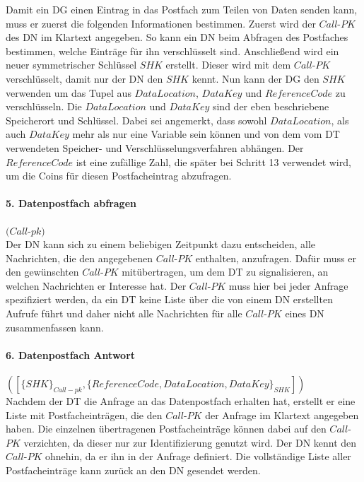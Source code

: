 \documentclass[
	fontsize=11pt,
	headings=small,
	parskip=half,           %
	bibliography=totoc,
	numbers=noenddot,       %
	open=any,               %
]{scrreprt}
\begin{document}
Damit ein DG einen Eintrag in das Postfach zum Teilen von Daten senden kann, muss er zuerst die folgenden Informationen bestimmen. Zuerst wird der $Call$-$PK$ des DN im Klartext angegeben. So kann ein DN beim Abfragen des Postfaches bestimmen, welche Einträge für ihn verschlüsselt sind. Anschließend wird ein neuer symmetrischer Schlüssel $SHK$ erstellt. Dieser wird mit dem $Call$-$PK$ verschlüsselt, damit nur der DN den $SHK$ kennt. Nun kann der DG den $SHK$ verwenden um das Tupel aus $DataLocation$, $DataKey$ und $ReferenceCode$ zu verschlüsseln. Die $DataLocation$ und $DataKey$ sind der eben beschriebene Speicherort und Schlüssel. Dabei sei angemerkt, dass sowohl $DataLocation$, als auch $DataKey$ mehr als nur eine Variable sein können und von dem vom DT verwendeten Speicher- und Verschlüsselungsverfahren abhängen. Der $ReferenceCode$ ist eine zufällige Zahl, die später bei Schritt 13 verwendet wird, um die Coins für diesen Postfacheintrag abzufragen.

\paragraph{5. Datenpostfach abfragen} $(Call$-$pk)$\\
Der DN kann sich zu einem beliebigen Zeitpunkt dazu entscheiden, alle Nachrichten, die den angegebenen $Call$-$PK$ enthalten, anzufragen. Dafür muss er den gewünschten $Call$-$PK$ mitübertragen, um dem DT zu signalisieren, an welchen Nachrichten er Interesse hat. Der $Call$-$PK$ muss hier bei jeder Anfrage spezifiziert werden, da ein DT keine Liste über die von einem DN erstellten Aufrufe führt und daher nicht alle Nachrichten für alle $Call$-$PK$ eines DN zusammenfassen kann.

\paragraph{6. Datenpostfach Antwort} $([\{SHK\}_{Call-pk}, \{ReferenceCode, DataLocation, DataKey\}_{SHK}])$\\
Nachdem der DT die Anfrage an das Datenpostfach erhalten hat, erstellt er eine Liste mit Postfacheinträgen, die den $Call$-$PK$ der Anfrage im Klartext angegeben haben. Die einzelnen übertragenen Postfacheinträge können dabei auf den $Call$-$PK$ verzichten, da dieser nur zur Identifizierung genutzt wird. Der DN kennt den $Call$-$PK$ ohnehin, da er ihn in der Anfrage definiert. Die vollständige Liste aller Postfacheinträge kann zurück an den DN gesendet werden.
\end{document}

